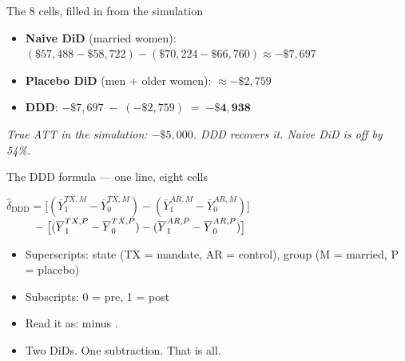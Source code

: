 \documentclass[aspectratio=169,11pt]{beamer}
\begin{document}
\begin{frame}{The 8 cells, filled in from the simulation}
\vspace{0.4em}
\begin{center}
\footnotesize

\end{center}
\vspace{0.6em}
\begin{itemize}\small
  \item \textbf{Naive DiD} (married women): $(\$57{,}488 - \$58{,}722) - (\$70{,}224 - \$66{,}760) \approx -\$7{,}697$
  \item \textbf{Placebo DiD} (men + older women): $\approx -\$2{,}759$
  \item \textbf{DDD}: $-\$7{,}697 \;-\; (-\$2{,}759) \;=\; \mathbf{-\$4{,}938}$
\end{itemize}
\vspace{0.3em}
\begin{center}
\small\color{warmgray}\itshape
True ATT in the simulation: $-\$5{,}000$. DDD recovers it. Naive DiD is off by 54\%.
\end{center}
\end{frame}

\begin{frame}{The DDD formula --- one line, eight cells}
\vspace{0.6em}
\begin{center}
\small
$\widehat{\delta}_{\text{DDD}} = \big[(\overline{Y}^{TX,M}_1 - \overline{Y}^{TX,M}_0) - (\overline{Y}^{AR,M}_1 - \overline{Y}^{AR,M}_0)\big]$\\[0.4em]
$\hspace{2.5em} - \;\big[(\overline{Y}^{TX,P}_1 - \overline{Y}^{TX,P}_0) - (\overline{Y}^{AR,P}_1 - \overline{Y}^{AR,P}_0)\big]$
\end{center}
\vspace{0.7em}
\begin{itemize}\small
  \item Superscripts: state (TX = mandate, AR = control), group (M = married, P = placebo)
  \item Subscripts: 0 = pre, 1 = post
  \item Read it as:  minus .
  \item Two DiDs. One subtraction. That is all.
\end{itemize}
\end{frame}
\end{document}
